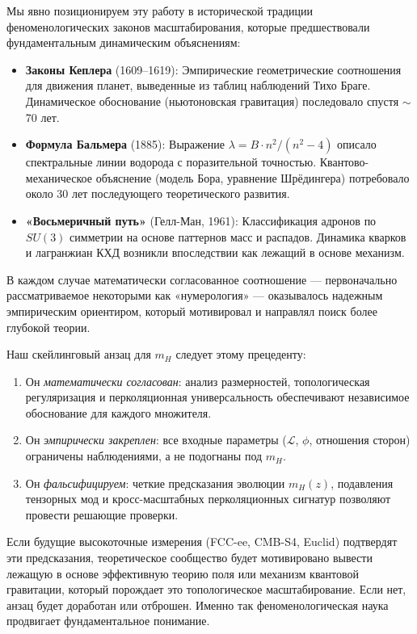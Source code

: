 \documentclass[11pt,a4paper]{article}
\newcommand{\Ltop}{\ensuremath{\mathcal{L}}}
\begin{document}
Мы явно позиционируем эту работу в исторической традиции феноменологических законов масштабирования, которые предшествовали фундаментальным динамическим объяснениям:

\begin{itemize}
    \item \textbf{Законы Кеплера} (1609--1619): Эмпирические геометрические соотношения для движения планет, выведенные из таблиц наблюдений Тихо Браге. Динамическое обоснование (ньютоновская гравитация) последовало спустя $\sim$70 лет.
    
    \item \textbf{Формула Бальмера} (1885): Выражение $\lambda = B \cdot n^2/(n^2-4)$ описало спектральные линии водорода с поразительной точностью. Квантово-механическое объяснение (модель Бора, уравнение Шрёдингера) потребовало около 30 лет последующего теоретического развития.
    
    \item \textbf{«Восьмеричный путь»} (Гелл-Ман, 1961): Классификация адронов по $SU(3)$ симметрии на основе паттернов масс и распадов. Динамика кварков и лагранжиан КХД возникли впоследствии как лежащий в основе механизм.
\end{itemize}

В каждом случае математически согласованное соотношение --- первоначально рассматриваемое некоторыми как «нумерология» --- оказывалось надежным эмпирическим ориентиром, который мотивировал и направлял поиск более глубокой теории.

Наш скейлинговый анзац для $m_H$ следует этому прецеденту:
\begin{enumerate}
    \item Он \textit{математически согласован}: анализ размерностей, топологическая регуляризация и перколяционная универсальность обеспечивают независимое обоснование для каждого множителя.
    \item Он \textit{эмпирически закреплен}: все входные параметры ($\Ltop$, $\phi$, отношения сторон) ограничены наблюдениями, а не подогнаны под $m_H$.
    \item Он \textit{фальсифицируем}: четкие предсказания эволюции $m_H(z)$, подавления тензорных мод и кросс-масштабных перколяционных сигнатур позволяют провести решающие проверки.
\end{enumerate}

Если будущие высокоточные измерения (FCC-ee, CMB-S4, Euclid) подтвердят эти предсказания, теоретическое сообщество будет мотивировано вывести лежащую в основе эффективную теорию поля или механизм квантовой гравитации, который порождает это топологическое масштабирование. Если нет, анзац будет доработан или отброшен. Именно так феноменологическая наука продвигает фундаментальное понимание.
\end{document}
